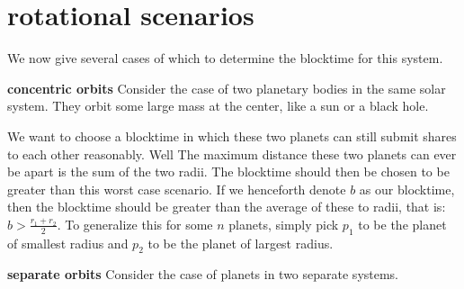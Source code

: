 \documentclass[conference]{IEEEtran}
\begin{document}
\section{rotational scenarios}
We now give several cases of which to determine the blocktime for this system.

\textbf{concentric orbits}
Consider the case of two planetary bodies in the same solar system. They orbit some large mass at the center, like a sun or a black hole. 
\newline

\begin{center}
\end{center}


We want to choose a blocktime in which these two planets can still submit shares to each other reasonably. Well The maximum distance these two planets can ever be apart is the sum of the two radii. The blocktime should then be chosen to be greater than this worst case scenario. If we henceforth denote $b$ as our blocktime, then the blocktime should be greater than the average of these to radii, that is: $b > \frac{r_1+r_2}{2}$. To generalize this for some $n$ planets, simply pick $p_1$ to be the planet of smallest radius and $p_2$ to be the planet of largest radius.

\textbf{separate orbits}
Consider the case of planets in two separate systems.
\begin{center}
\end{center}
\end{document}
